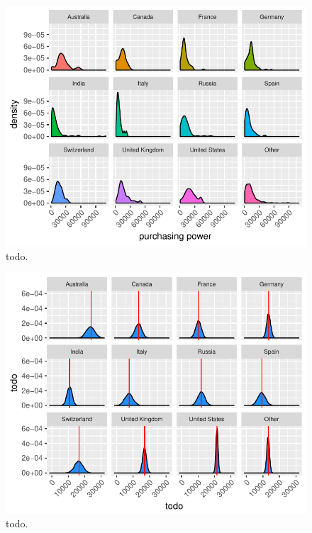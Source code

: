 \documentclass{article}
\begin{document}
\begin{figure}[H]
\centering
\includegraphics{report-023}
\caption{todo.}\label{fig_6}
\end{figure}




\begin{figure}[H]
\centering
\includegraphics{report-027}
\caption{todo.}\label{fig_7}
\end{figure}
\end{document}
